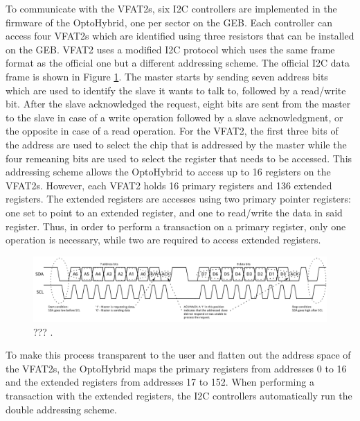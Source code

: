       To communicate with the VFAT2s, six I2C controllers are implemented in the firmware of the OptoHybrid, one per sector on the GEB. Each controller can access four VFAT2s which are identified using three resistors that can be installed on the GEB. VFAT2 uses a modified I2C protocol which uses the same frame format as the official one but a different addressing scheme. The official I2C data frame is shown in Figure \ref{fig:II-3-i2c}. The master starts by sending seven address bits which are used to identify the slave it wants to talk to, followed by a read/write bit. After the slave acknowledged the request, eight bits are sent from the master to the slave in case of a write operation followed by a slave acknowledgment, or the opposite in case of a read operation. For the VFAT2, the first three bits of the address are used to select the chip that is addressed by the master while the four remeaning bits are used to select the register that needs to be accessed. This addressing scheme allows the OptoHybrid to access up to 16 registers on the VFAT2s. However, each VFAT2 holds 16 primary registers and 136 extended registers. The extended registers are accesses using two primary pointer registers: one set to point to an extended register, and one to read/write the data in said register. Thus, in order to perform a transaction on a primary register, only one operation is necessary, while two are required to access extended registers. \\

      \begin{figure}[h!]
        \centering
        \includegraphics[width=\textwidth]{img/II-3-test-beam/i2c.png}
        \caption{??? \cite{I2C}.}
        \label{fig:II-3-i2c}
      \end{figure}

      To make this process transparent to the user and flatten out the address space of the VFAT2s, the OptoHybrid maps the primary registers from addresses 0 to 16 and the extended registers from addresses 17 to 152. When performing a transaction with the extended registers, the I2C controllers automatically run the double addressing scheme. \\

